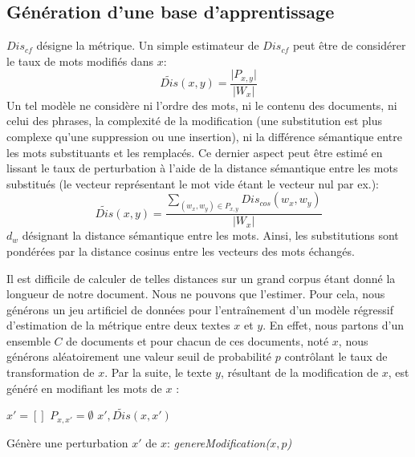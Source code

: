 \subsection{Génération d'une base d'apprentissage}
 $Dis_{cf}$ désigne la métrique. Un simple estimateur de $Dis_{cf}$ peut être de considérer le taux de mots modifiés dans $x$: 
\begin{equation}
\widetilde{Dis}(x,y) = \frac{\vert P_{x,y} \vert }{\vert W_x\vert }
\end{equation}
 Un tel modèle ne considère ni l'ordre des mots, ni le contenu des documents, ni celui des phrases, la complexité de la modification (une substitution est plus complexe qu'une suppression ou une insertion), ni la différence sémantique entre les mots substituants et les remplacés. Ce dernier aspect peut être estimé en lissant le taux de perturbation à l'aide de la distance sémantique entre les mots substitués (le vecteur représentant le mot vide étant le vecteur nul par ex.):
\begin{equation}
\widetilde{Dis}(x,y) = \frac{\sum\limits_{(w_x, w_y) \in P_{x,y}} Dis_{cos}(w_x,w_y)}{\vert W_x\vert} \label{equation:similarite:somme-dist-mots}
\end{equation}
$d_w$ désignant la distance sémantique entre les mots. Ainsi, les substitutions sont pondérées par la distance cosinus entre les vecteurs des mots échangés.

Il est difficile de calculer de telles distances sur un grand corpus étant donné la longueur de notre document. 
Nous ne pouvons que l'estimer. Pour cela, nous générons un jeu artificiel de données pour l'entraînement d'un modèle régressif d'estimation de la métrique entre deux textes $x$ et $y$. En effet, nous partons d'un ensemble $C$ de documents et pour chacun de ces documents, noté $x$, nous générons aléatoirement une valeur seuil de probabilité $p$ contrôlant le taux de transformation de $x$. Par la suite, le texte  $y$, résultant de la modification de $x$, est généré en modifiant les mots de $x$ :

\begin{algorithm}[!htb] %
 ${x'} = [] $\; 
 $P_{x,x'} = \emptyset$\;
 \Return $x', \widetilde{Dis}(x,x')$\;
 \caption{Génère une perturbation $x'$ de $x$: \textit{genereModification($x, p$)}} \label{algo:similarite:perturbation}
\end{algorithm}


